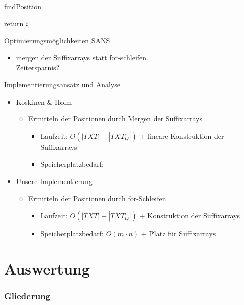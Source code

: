 \documentclass[xcolor=dvipsnames, aspectratio=1610]{beamer}
\begin{document}
\begin{frame}{findPosition}
  \begin{algorithmic}
          \State return $i$ 
        \EndIf
      \EndFor 
    \EndFunction
  \end{algorithmic} 
\end{frame}

\begin{frame}{Optimierungsmöglichkeiten SANS}
  \begin{itemize}
    \item mergen der Suffixarrays statt for-schleifen.\\
          Zeitersparnis?    
  \end{itemize}
\end{frame}

\begin{frame}{Implementierungsansatz und Analyse}
  \begin{itemize}
    \item Koskinen \& Holm
      \begin{itemize}
        \item Ermitteln der Positionen durch Mergen der Suffixarrays
          \begin{itemize}
            \item Laufzeit: $O(|TXT|+|TXT_Q|)$ + lineare Konstruktion der Suffixarrays
            \item Speicherplatzbedarf:
          \end{itemize}
      \end{itemize}
    \item Unsere Implementierung
      \begin{itemize}
        \item Ermitteln der Positionen durch for-Schleifen
          \begin{itemize}
            \item Laufzeit: $O(|TXT|+|TXT_Q|)$ + Konstruktion der Suffixarrays
            \item Speicherplatzbedarf: $O(m \cdot n)$ + Platz für Suffixarrays
          \end{itemize}
      \end{itemize}
  \end{itemize}
\end{frame}

\section{Auswertung}
  \begin{frame} 
    \frametitle{Gliederung}
    \tableofcontents[currentsection]
  \end{frame}
\end{document}

